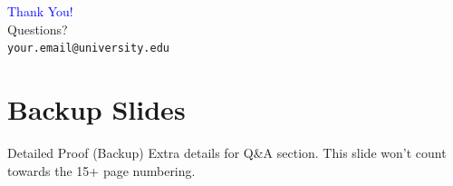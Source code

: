 \documentclass[10pt, aspectratio=169]{beamer} %
\begin{document}
\begin{frame}
    \centering
    \Huge \textcolor{blue}{Thank You!} \\
    \vspace{0.5cm}
    \normalsize Questions? \\
    \vspace{1cm}
    \small \texttt{your.email@university.edu}
\end{frame}

\appendix
\section*{Backup Slides}
\begin{frame}{Detailed Proof (Backup)}
    Extra details for Q\&A section. This slide won't count towards the 15+ page numbering.
\end{frame}
\end{document}
